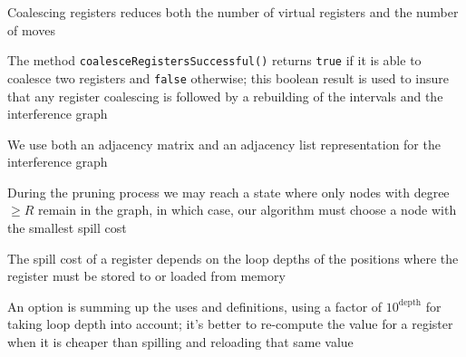 \documentclass[8pt,a4paper,compress]{beamer}
\begin{document}
\begin{frame}[fragile]
\pause

Coalescing registers reduces both the number of virtual registers and the number of moves

\pause
\bigskip

The method \lstinline{coalesceRegistersSuccessful()} returns \lstinline{true} if it is able to coalesce two registers and \lstinline{false} otherwise; this boolean result is used to insure that any register coalescing is followed by a rebuilding of the intervals and the interference graph

\pause
\bigskip

We use both an adjacency matrix and an adjacency list representation for the interference graph

\pause
\bigskip

During the pruning process we may reach a state where only nodes with degree $\ge R$ remain in the graph, in which case, our algorithm must choose a node with the smallest spill cost

\pause
\bigskip

The spill cost of a register depends on the loop depths of the positions where the register must be stored to or loaded from memory

\pause
\bigskip

An option is summing up the uses and definitions, using a factor of $10^\text{depth}$ for taking loop depth into account; it's better to re-compute the value for a register when it is cheaper than spilling
and reloading that same value
\end{frame}
\end{document}
